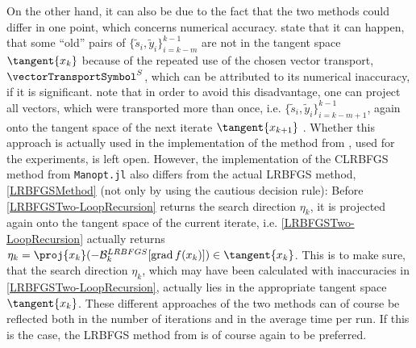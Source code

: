 On the other hand, it can also be due to the fact that the two methods could differ in one point, which concerns numerical accuracy. \cite{HuangGallivanAbsil:2015} state that it can happen, that some “old” pairs of $\{ \widetilde{s}_i, \widetilde{y}_i\}_{i=k-m}^{k-1}$ are not in the tangent space $\tangent{x_k}$ because of the repeated use of the chosen vector transport, $\vectorTransportSymbol^S$, which can be attributed to its numerical inaccuracy, if it is significant. \cite{HuangGallivanAbsil:2015} note that in order to avoid this disadvantage, one can project all vectors, which were transported more than once, i.e. $\{ \widetilde{s}_i, \widetilde{y}_i \}_{i=k-m+1}^{k-1}$, again onto the tangent space of the next iterate $\tangent{x_{k+1}}$ \cite[p.~1676]{HuangGallivanAbsil:2015}. Whether this approach is actually used in the implementation of the method from \cite{HuangGallivanAbsil:2015}, used for the experiments, is left open. However, the implementation of the CLRBFGS method from \lstinline!Manopt.jl! also differs from the actual LRBFGS method, \cref{LRBFGSMethod} (not only by using the cautious decision rule): Before \cref{LRBFGSTwo-LoopRecursion} returns the search direction $\eta_k$, it is projected again onto the tangent space of the current iterate, i.e. \cref{LRBFGSTwo-LoopRecursion} actually returns $\eta_k =  \proj{x_k}(- \mathcal{B}^{LRBFGS}_k[\operatorname{grad} f(x_k)]) \in \tangent{x_k}$. This is to make sure, that the search direction $\eta_k$, which may have been calculated with inaccuracies in \cref{LRBFGSTwo-LoopRecursion}, actually lies in the appropriate tangent space $\tangent{x_k}$. These different approaches of the two methods can of course be reflected both in the number of iterations and in the average time per run. If this is the case, the LRBFGS method from \cite{HuangGallivanAbsil:2015} is of course again to be preferred.
